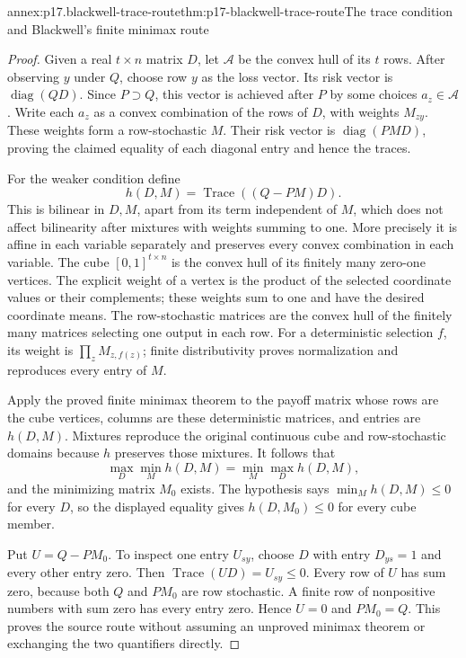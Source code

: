 \begin{annexitem}{annex:p17.blackwell-trace-route}{thm:p17-blackwell-trace-route}{The trace condition and Blackwell's finite minimax route}
\begin{proof}
Given a real \(t\times n\) matrix \(D\), let \(\mathcal A\) be the
convex hull of its \(t\) rows. After observing \(y\) under \(Q\),
choose row \(y\) as the loss vector. Its risk vector is
\(\operatorname{diag}(QD)\). Since \(P\supset Q\), this vector
is achieved after \(P\) by some choices \(a_z\in\mathcal A\).
Write each \(a_z\) as a convex combination of the rows of \(D\),
with weights \(M_{zy}\). These weights form a row-stochastic \(M\).
Their risk vector is \(\operatorname{diag}(PMD)\), proving the
claimed equality of each diagonal entry and hence the traces.

For the weaker condition define
\[
                         h(D,M)=\operatorname{Trace}((Q-PM)D).
\]
This is bilinear in \(D,M\), apart from its term independent of \(M\),
which does not affect bilinearity after mixtures with weights summing
to one. More precisely it is affine in each variable separately and
preserves every convex combination in each variable.
The cube \([0,1]^{t\times n}\) is the convex hull of its finitely many
zero-one vertices. The explicit weight of a vertex is the product
of the selected coordinate values or their complements; these weights
sum to one and have the desired coordinate means.
The row-stochastic matrices are the convex hull of the finitely many
matrices selecting one output in each row. For a deterministic selection
\(f\), its weight is \(\prod_zM_{z,f(z)}\); finite distributivity
proves normalization and reproduces every entry of \(M\).

Apply the proved finite minimax theorem to the payoff matrix whose
rows are the cube vertices, columns are these deterministic matrices,
and entries are \(h(D,M)\). Mixtures reproduce the original continuous
cube and row-stochastic domains because \(h\) preserves those mixtures.
It follows that
\[
               \max_D\min_M h(D,M)=\min_M\max_D h(D,M),
\]
and the minimizing matrix \(M_0\) exists.
The hypothesis says \(\min_M h(D,M)\leq0\) for every \(D\), so
the displayed equality gives \(h(D,M_0)\leq0\) for every cube member.

Put \(U=Q-PM_0\). To inspect one entry \(U_{sy}\), choose \(D\)
with entry \(D_{ys}=1\) and every other entry zero.
Then \(\operatorname{Trace}(UD)=U_{sy}\leq0\).
Every row of \(U\) has sum zero, because both \(Q\) and \(PM_0\)
are row stochastic. A finite row of nonpositive numbers with sum
zero has every entry zero. Hence \(U=0\) and \(PM_0=Q\).
This proves the source route without assuming an unproved minimax
theorem or exchanging the two quantifiers directly.
\end{proof}
\end{annexitem}

